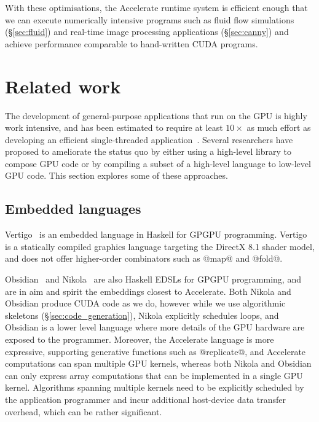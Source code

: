 With these optimisations, the Accelerate runtime system is efficient enough that
we can execute numerically intensive programs such as fluid flow simulations
(\S\ref{sec:fluid}) and real-time image processing applications
(\S\ref{sec:canny}) and achieve performance comparable to hand-written CUDA
programs.


\section{Related work}
\label{sec:implementation_related}

The development of general-purpose applications that run on the GPU is highly
work intensive, and has been estimated to require at least $10\times$ as much
effort as developing an efficient single-threaded
application~\cite{Sweeney:2009ua}. Several researchers have proposed to
ameliorate the status quo by either using a high-level library to compose GPU
code or by compiling a subset of a high-level language to low-level GPU code.
This section explores some of these approaches.


\subsection{Embedded languages}


Vertigo~\cite{Elliott:2004hh} is an embedded language in Haskell for GPGPU
programming. Vertigo is a statically compiled graphics language targeting the
DirectX 8.1 shader model, and does not offer higher-order combinators such as
@map@ and @fold@.

Obsidian~\cite{Svensson:2008a} and Nikola~\cite{Mainland:2010vj} are also
Haskell EDSLs for GPGPU programming, and are in aim and spirit the embeddings
closest to Accelerate. Both Nikola and Obsidian produce CUDA code as we do,
however while we use algorithmic skeletons (\S\ref{sec:code_generation}), Nikola
explicitly schedules loops, and Obsidian is a lower level language where more
details of the GPU hardware are exposed to the programmer. Moreover, the
Accelerate language is more expressive, supporting generative functions such as
@replicate@, and Accelerate computations can span multiple GPU kernels, whereas
both Nikola and Obsidian can only express array computations that can be
implemented in a single GPU kernel. Algorithms spanning multiple kernels need to
be explicitly scheduled by the application programmer and incur additional
host-device data transfer overhead, which can be rather significant.

